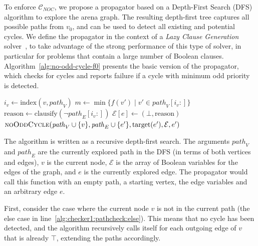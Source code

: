 \documentclass[a4paper,UKenglish,cleveref, autoref, thm-restate, anonymous]{lipics-v2021}
\begin{document}
To enforce $\mathcal{C}_{NOC}$, we propose a propagator based on a Depth-First Search (DFS) algorithm to explore the arena graph. The resulting depth-first tree captures all possible paths from $v_0$, and can be used to detect all existing and potential
cycles. We define the propagator in the context of a \textit{Lazy Clause Generation} solver~\cite{DBLP:journals/constraints/OhrimenkoSC09}, to take advantage of the strong performance of this type of solver, in particular for problems that contain a large number of Boolean clauses. Algorithm~\ref{alg:no-odd-cycle-f0} presents the basic version of the propagator, which checks for cycles and reports failure if a cycle with minimum odd priority is detected.

\begin{algorithm}
    \caption{Implementation of \noc as checker ($\mathsf{Checker}$)}
    \small
    \begin{algorithmic}[1]
         \label{alg:checker1:pathcheck}
            \State $i_v \gets \text{index}(v, \mathit{path}_V)$
            \State $m \gets \min\{f(v') \mid v' \in \mathit{path}_V[i_v:]\}$
             \label{alg:checker1:checkodd}
                \State $\text{reason} \gets \text{clausify}(\neg \mathit{path}_E[i_v:])$ \label{alg:checker1:reason}
                \State $\mathcal{E}[e] \gets (\bot, \text{reason})$
            \EndIf
        \Else \label{alg:checker1:pathcheck:else}
                \State $\Call{noOddCycle}{\mathit{path}_V \cup \{v\}, \mathit{path}_E \cup \{e'\}, \text{target}(e'), \mathcal{E}, e'}$
            \EndFor
        \EndIf
    \EndFunction
    \end{algorithmic}
    \label{alg:no-odd-cycle-f0}
\end{algorithm}

The algorithm is written as a recursive depth-first search. The arguments $\mathit{path}_V$ and $\mathit{path}_E$ are the currently explored path in the DFS (in terms of both vertices and edges), $v$ is the current node, $\mathcal{E}$ is the array of Boolean variables for the edges of the graph, and $e$ is the currently explored edge. The \noc propagator would call this function with an empty path, a starting vertex, the edge variables and an arbitrary edge $e$.

First, consider the case where the current node $v$ is not in the current path (the else case 
 in line~\ref{alg:checker1:pathcheck:else}). This means that no cycle has been detected, and the algorithm recursively calls itself for each outgoing edge of $v$ that is already $\top$, extending the paths accordingly.
\end{document}
